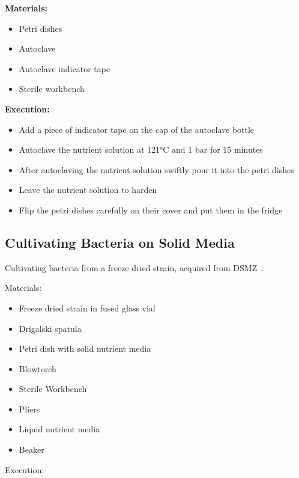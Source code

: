 \textbf{Materials:}

\begin{itemize}
    \item Petri dishes
    \item Autoclave
    \item Autoclave indicator tape
    \item Sterile workbench
\end{itemize}


\textbf{Execution:}

\begin{itemize}
    \item Add a piece of indicator tape on the cap of the autoclave bottle
    \item Autoclave the nutrient solution at 121°C and 1 bar for 15 minutes
    \item After autoclaving the nutrient solution swiftly pour it into the petri dishes
    \item Leave the nutrient solution to harden
    \item Flip the petri dishes carefully on their cover and put them in the fridge
\end{itemize}

\subsection{Cultivating Bacteria on Solid Media}

Cultivating bacteria from a freeze dried strain, acquired from DSMZ~\cite{dsmzbacteria}.

Materials:

\begin{itemize}
    \item Freeze dried strain in fused glass vial
    \item Drigalski spatula
    \item Petri dish with solid nutrient media
    \item Blowtorch
    \item Sterile Workbench
    \item Pliers
    \item Liquid nutrient media
    \item Beaker
\end{itemize}


Execution:


